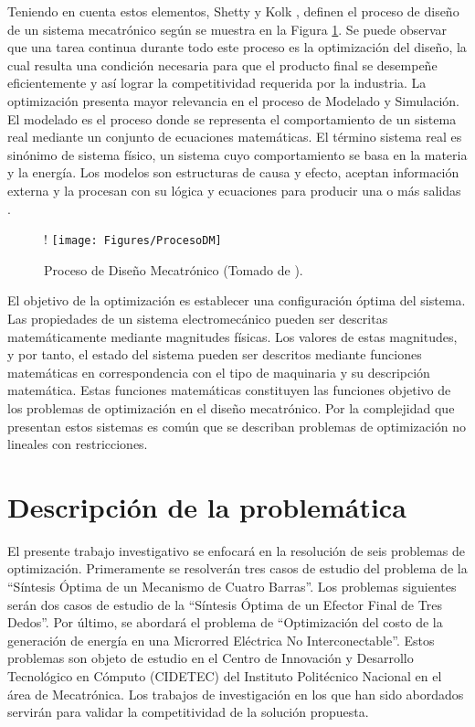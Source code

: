  Teniendo en cuenta estos elementos, Shetty y Kolk \cite{shetty_mechatronics_2010}, definen el proceso de diseño de un sistema mecatrónico según se muestra en la Figura \ref{DMecatronico}. Se puede observar que una tarea continua durante todo este proceso es la optimización del diseño, la cual resulta una condición necesaria para que el producto final se desempeñe eficientemente y así lograr la competitividad requerida por la industria. La optimización presenta mayor relevancia en el proceso de Modelado y Simulación. El modelado es el proceso  donde se representa el comportamiento de un sistema real mediante un conjunto de  ecuaciones matemáticas. El término sistema real es sinónimo de sistema físico, un sistema cuyo comportamiento se basa en la materia y la energía. Los modelos son estructuras de causa y efecto, aceptan información externa y la procesan con su lógica y ecuaciones para producir una o más salidas \cite{fritzson_basic_2011}.
	
	\begin{figure}[htb]
		\begin{center}
		 \resizebox {\textwidth} {!} {	
			\texttt{[image: Figures/ProcesoDM]}
		}
			\caption[Proceso de Diseño Mecatrónico]{Proceso de Diseño Mecatrónico (Tomado de \cite{shetty_mechatronics_2010}).}
			\label{DMecatronico}
		\end{center}
	\end{figure}


 El objetivo de la optimización es establecer una configuración óptima del sistema. Las propiedades de un sistema electromecánico pueden ser descritas matemáticamente mediante magnitudes físicas. Los valores de estas magnitudes, y por tanto, el estado del sistema pueden ser descritos mediante funciones matemáticas en correspondencia con el tipo de maquinaria y su descripción matemática.  Estas funciones matemáticas constituyen las funciones objetivo de los problemas de optimización en el diseño mecatrónico. Por la complejidad que presentan estos sistemas es común que se describan problemas de optimización no lineales con  restricciones.

 \section{Descripción de la problemática}
  El presente trabajo investigativo se enfocará en la resolución de seis problemas de optimización. Primeramente se resolverán tres casos de estudio del problema de la ``Síntesis Óptima de un Mecanismo de Cuatro Barras''. Los problemas siguientes serán dos casos de estudio de la ``Síntesis Óptima de un Efector Final de Tres Dedos''. Por último, se abordará el problema de ``Optimización del costo de la generación de energía en una Microrred Eléctrica No Interconectable''. Estos problemas son objeto de estudio en el Centro de Innovación y Desarrollo Tecnológico  en Cómputo (CIDETEC) del Instituto Politécnico Nacional en el área de Mecatrónica. Los trabajos de investigación en los que han sido abordados servirán para validar la competitividad de la solución propuesta. 

